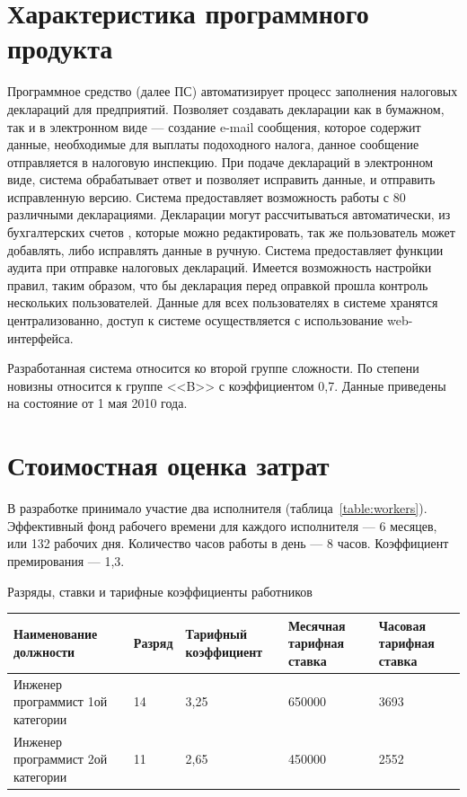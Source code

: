 \documentclass[14pt,a4paper]{reportmod}
\begin{document}
\section{Характеристика программного продукта}
Программное средство (далее ПС) автоматизирует процесс заполнения налоговых деклараций для предприятий. Позволяет создавать декларации как в бумажном, так и в электронном виде — создание e-mail сообщения, которое содержит данные, необходимые для выплаты подоходного налога, данное сообщение отправляется в налоговую инспекцию. При подаче деклараций в электронном виде, система обрабатывает ответ и позволяет исправить данные, и отправить исправленную версию.  Система предоставляет возможность работы с 80 различными декларациями.  Декларации могут рассчитываться автоматически, из бухгалтерских счетов , которые можно редактировать, так же пользователь может добавлять, либо исправлять данные в ручную. Система предоставляет функции аудита при отправке налоговых деклараций. Имеется возможность настройки правил, таким образом, что бы декларация перед оправкой прошла контроль нескольких пользователей.  Данные для всех пользователях в системе хранятся централизованно, доступ к системе осуществляется с использование web-интерфейса.

Разработанная система относится ко второй группе сложности. По  степени новизны относится к группе <<B>> с коэффициентом 0,7. Данные приведены на состояние от 1 мая 2010 года.

\section{Стоимостная оценка затрат}

В разработке принимало участие два исполнителя (таблица~\ref{table:workers}).  Эффективный фонд рабочего времени для каждого исполнителя — 6 месяцев, или 132 рабочих дня. Количество часов работы в день — 8 часов. Коэффициент премирования — 1,3.
\begin{table}[ht]
  \caption{Разряды, ставки и тарифные коэффициенты работников}
  \label{table:workers}
\end{table}
\vspace{-0.5cm}
\begin{small}
\begin{longtable}{|p{7cm}|p{1.6cm}|p{2cm}|p{2cm}|p{2cm}|}
    \hline
    \bfseries{Наименование должности} &
    \bfseries{Разряд} &
    \bfseries{Тарифный коэффициент} &
    \bfseries{Месячная тарифная ставка} &
    \bfseries{Часовая тарифная ставка} \\
    \hline
    Инженер программист 1ой категории & 14 & 3,25 & 650000 & 3693\\ \hline
    Инженер программист 2ой категории & 11 & 2,65 & 450000 & 2552\\ \hline
\end{longtable}
\end{small}
\end{document}
